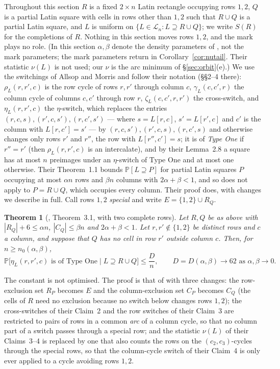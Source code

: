 \documentclass[11pt]{article}
\newtheorem{theorem}{Theorem}[section]
\theoremstyle{definition}
\renewcommand{\Pr}{\mathbb{P}}
\begin{document}
Throughout this section $R$ is a fixed $2\times n$ Latin rectangle occupying rows $1,2$,
$Q$ is a partial Latin square with cells in rows other than $1,2$ such that $R\cup Q$ is a
partial Latin square, and $L$ is uniform on $\{L\in\mathcal L_n:L\supseteq R\cup Q\}$; we
write $S(R)$ for the completions of $R$.  Nothing in this section moves rows $1,2$, and
the mark plays no role.  (In this section $\alpha,\beta$ denote the density parameters of
\cite{AM26}, not the mark parameters; the mark parameters return in
Corollary~\ref{cor:nutail}.  Their statistic $\nu(L)$ is not used; our $\nu$ is the arc
minimum of \S\ref{sec:orbit}(e).)  We use the switchings of Allsop and Morris \cite{AM26} and follow
their notation (\S\S2--4 there): $\rho_L(r,r',c)$ is the row cycle of rows $r,r'$ through
column $c$, $\gamma_L(c,c',r)$ the column cycle of columns $c,c'$ through row $r$,
$\zeta_L(c,c',r,r')$ the cross-switch, and $\eta_L(r,r',c)$ the $\eta$-switch, which
replaces the entries $(r,c,s),(r',c,s'),(r,c',s')$ --- where $s=L[r,c]$, $s'=L[r',c]$ and
$c'$ is the column with $L[r,c']=s'$ --- by $(r,c,s'),(r',c,s),(r,c',s)$ and otherwise
changes only rows $r'$ and $r''$, the row with $L[r'',c']=s$; it is of \emph{Type One} if
$r''=r'$ (then $\rho_L(r,r',c)$ is an intercalate), and by their Lemma~2.8 a square has
at most $n$ preimages under an $\eta$-switch of Type One and at most one otherwise.  Their
Theorem~1.1 bounds $\Pr[L\supseteq P]$ for partial Latin squares $P$ occupying at most
$\alpha n$ rows and $\beta n$ columns with $2\alpha+\beta<1$, and so does not apply to
$P=R\cup Q$, which occupies every column.  Their proof does, with changes we describe in
full.  Call rows $1,2$ \emph{special} and write $E=\{1,2\}\cup R_Q$.

\begin{theorem}[\cite{AM26}, Theorem~3.1, with two complete rows]\label{thm:AM31two}
Let $R,Q$ be as above with $|R_Q|+6\le\alpha n$, $|C_Q|\le\beta n$ and $2\alpha+\beta<1$.
Let $r,r'\notin\{1,2\}$ be distinct rows and $c$ a column, and suppose that $Q$ has no
cell in row $r'$ outside column $c$.  Then, for $n\ge n_0(\alpha,\beta)$,
\[
\Pr\bigl[\eta_L(r,r',c)\text{ is of Type One}\;\big|\;L\supseteq R\cup Q\bigr]\le\frac{D}{n},
\qquad D=D(\alpha,\beta)\to62\text{ as }\alpha,\beta\to0 .
\]
\end{theorem}

The constant is not optimised.  The proof is that of \cite{AM26} with three changes: the
row-exclusion set $R_P$ becomes $E$ and the column-exclusion set $C_P$ becomes $C_Q$ (the
cells of $R$ need no exclusion because no switch below changes rows $1,2$); the
cross-switches of their Claim~2 and the row switches of their Claim~3 are restricted to
pairs of rows in a common \emph{arc} of a column cycle, so that no column part of a switch
passes through a special row; and the statistic $\nu(L)$ of their Claims~3--4 is replaced by
one that also counts the rows on the $(c_2,c_3)$-cycles through the special rows, so that the
column-cycle switch of their Claim~4 is only ever applied to a cycle avoiding rows $1,2$.
\end{document}
